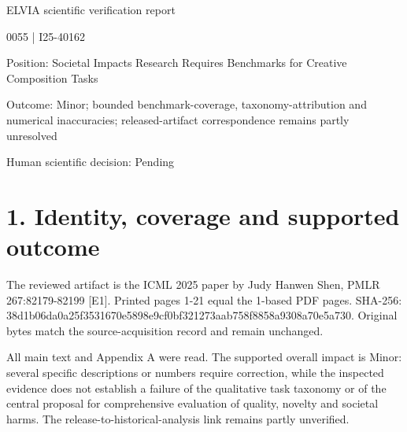 \documentclass[10pt]{article}
\begin{document}
ELVIA scientific verification report\par
0055 | I25-40162\par
Position: Societal Impacts Research Requires Benchmarks for Creative Composition Tasks\par
Outcome: Minor; bounded benchmark-coverage, taxonomy-attribution and numerical inaccuracies; released-artifact correspondence remains partly unresolved\par
Human scientific decision: Pending\par
\section*{1. Identity, coverage and supported outcome}
The reviewed artifact is the ICML 2025 paper by Judy Hanwen Shen, PMLR 267:82179-82199 [E1]. Printed pages 1-21 equal the 1-based PDF pages. SHA-256: 38d1b06da0a25f3531670e5898e9cf0bf321273aab758f8858a9308a70e5a730. Original bytes match the source-acquisition record and remain unchanged.\par
All main text and Appendix A were read. The supported overall impact is Minor: several specific descriptions or numbers require correction, while the inspected evidence does not establish a failure of the qualitative task taxonomy or of the central proposal for comprehensive evaluation of quality, novelty and societal harms. The release-to-historical-analysis link remains partly unverified.\par
\end{document}
